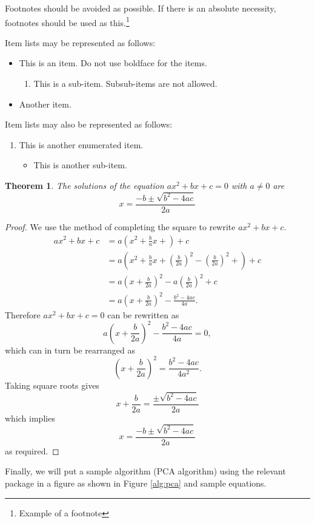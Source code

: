 \documentclass[a4paper,onesided,12pt]{report}
\newtheorem{thm}{Theorem}[chapter]
\begin{document}
Footnotes should be avoided as possible. If there is an absolute
necessity, footnotes should be used as this.\footnote{Example of a
footnote}

Item lists may be represented as follows:

\begin{itemize}
 \item This is an item. Do not use boldface for the items.
\begin{enumerate}
 \item This is a sub-item. Subsub-items are not allowed.
\end{enumerate}
\item Another item.
\end{itemize}
Item lists may also be represented as follows:
\begin{enumerate}
 \item This is another enumerated item.
\begin{itemize}
 \item This is another sub-item.
\end{itemize}

\end{enumerate}

\begin{thm}
The solutions of the equation $ax^2+bx+c=0$ with $a\neq 0$ are
$$
x=\frac{-b\pm \sqrt{b^2-4ac}}{2a}
$$
\end{thm}


\begin{proof}
We use the method of completing the square to rewrite $ax^2+bx+c$.
\begin{align*}
ax^2+bx+c&=a\left( x^2 + \frac{b}{a}x+\right)+c \\
  &=a\left( x^2 + \frac{b}{a}x+ \left(\frac{b}{2a}\right)^2
     -\left(\frac{b}{2a}\right)^2 +\right)+c \\
  &=a\left( x+\frac{b}{2a}\right)^2 - 
a\left(\frac{b}{2a}\right)^2+c\\
  &= a\left( x+\frac{b}{2a}\right)^2- \frac{b^2-4ac}{4a}.
\end{align*}
Therefore $ax^2+bx+c=0$ can be rewritten as 
$$
a\left( x+\frac{b}{2a}\right)^2- \frac{b^2-4ac}{4a}=0,
$$
which can in turn  be rearranged as
$$
\left( x+\frac{b}{2a}\right)^2= \frac{b^2-4ac}{4a^2}.
$$
Taking square roots gives
$$
x+\frac{b}{2a}= \frac{\pm \sqrt{b^2-4ac}}{2a}
$$
which implies
$$
x=\frac{-b\pm \sqrt{b^2-4ac}}{2a}
$$
as required.
\end{proof}
Finally, we will put a sample algorithm (PCA algorithm) using the
relevant package in a figure as shown in Figure \ref{alg:pca} and
sample equations.
\end{document}
